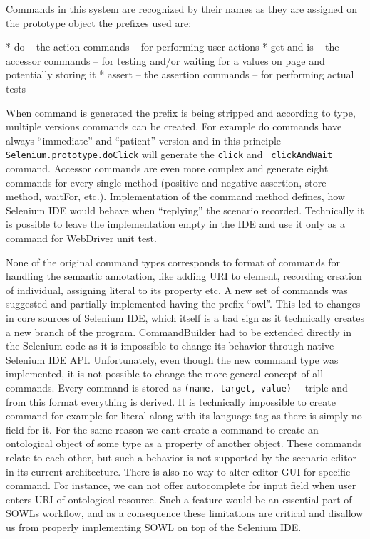 Commands in this system are recognized by their names as they are assigned on
the prototype object the prefixes used are: 

\begitems
  * do -- the action commands -- for performing user actions
  * get and is -- the accessor commands -- for testing and/or waiting for a
    values on page and potentially storing it
  * assert -- the assertion commands -- for performing actual tests
\enditems

When command is generated the prefix is being stripped and according to type,
multiple versions commands can be created. For example do commands have always
``immediate'' and ``patient'' version and in this principle {\tt
Selenium.prototype.doClick} will generate the {\tt click} and {\tt
clickAndWait} command. Accessor commands are even more complex and generate
eight commands for every single method (positive and negative assertion, store
method, waitFor, etc.). Implementation of the command method defines, how
Selenium IDE would behave when ``replying'' the scenario recorded. Technically it
is possible to leave the implementation empty in the IDE and use it only as a
command for WebDriver unit test. 

None of the original command types corresponds to format of commands for
handling the semantic annotation, like adding URI to element, recording
creation of individual, assigning literal to its property etc. A new set of
commands was suggested and partially implemented having the prefix ``owl''.
This led to changes in core sources of Selenium IDE, which itself is a bad sign
as it technically creates a new branch of the program. CommandBuilder had to be
extended directly in the Selenium code as it is impossible to change its
behavior through native Selenium IDE API. Unfortunately, even though the new
command type was implemented, it is not possible to change the more general
concept of all commands. Every command is stored as {\tt (name, target, value)
}~ triple and from this format everything is
derived. It is technically impossible to create command for example for literal
along with its language tag as there is simply no field for it. For the same
reason we cant create a command to create an ontological object of some type as
a property of another object.  These commands relate to each other, but such a
behavior is not supported by the scenario editor in its current architecture.
There is also no way to alter editor GUI for specific command. For instance, we
can not offer autocomplete for input field when user enters URI of ontological
resource. Such a feature would be an essential part of SOWLs workflow, and as
a consequence these limitations are critical and disallow us from properly
implementing SOWL on top of the Selenium IDE. 


